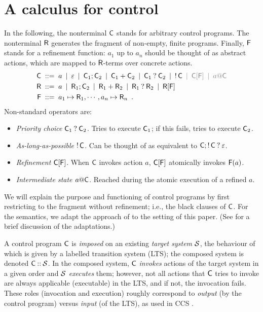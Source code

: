 \section{A calculus for control}
\label{sec:calculus}

In the following, the nonterminal $\mathsf{C}$ stands for arbitrary control programs. The nonterminal $\mathsf{R}$ generates the fragment of non-empty, finite programs. Finally, $\mathsf{F}$ stands for a refinement function: $a_1$ up to $a_n$ should be thought of as abstract actions, which are mapped to $\mathsf{R}$-terms over concrete actions.
%
\begin{align*}
\rC & \ruleis a \rulemid \term \rulemid \rC_1;\rC_2 \rulemid \rC_1+\rC_2 \rulemid \rC_1\orelse \rC_2 \rulemid \alap \rC \color{gray} \rulemid \rC[\rF] \rulemid a@\rC \color{black} \\
\rR & \ruleis a \rulemid \rR_1;\rC_2 \rulemid \rR_1+\rR_2 \rulemid \rR_1\orelse \rR_2 \rulemid \rR[\rF] \\
\rF & \ruleis a_1 \mapsto \rR_1, \cdots, a_n\mapsto \rR_n \enspace.
\end{align*}
%
Non-standard operators are:
\begin{itemize}
\item \emph{Priority choice} $\mathsf{C}_1\mathbin{?} \mathsf{C}_2$. Tries to execute $\mathsf{C}_1$; if this fails, tries to execute $\mathsf{C}_2$.
\item \emph{As-long-as-possible} $\mathop{!} \mathsf{C}$. Can be thought of as equivalent to $\mathsf{C};\mathop{!} \mathsf{C}\mathbin{?} \varepsilon$.
\item \emph{Refinement} $\mathsf{C}[\mathsf{F}]$. When $\mathsf{C}$ invokes action $a$, $\mathsf{C}[\mathsf{F}]$ atomically invokes $\mathsf{F}(a)$.
\item \emph{Intermediate state $a@\mathsf{C}$}. Reached during the atomic execution of a refined $a$.
\end{itemize}
%
We will explain the purpose and functioning of control programs by first restricting to the fragment without refinement; i.e., the black clauses of $\mathsf{C}$. For the semantics, we adapt the approach of \cite{CCS-Priority-Choice} to the setting of this paper. (See  for a brief discussion of the adaptations.)

A control program $\mathsf{C}$ is \emph{imposed} on an existing \emph{target system} $\mathcal{S}$, the behaviour of which is given by a labelled transition system (LTS); the composed system is denoted $\mathsf{C}\mathbin{{:}{:}}\mathcal{S}$. In the composed system, $\mathsf{C}$ \emph{invokes} actions of the target system in a given order and $\mathcal{S}$ \emph{executes} them; however, not all actions that $\mathsf{C}$ tries to invoke are always applicable (executable) in the LTS, and if not, the invocation fails. These roles (invocation and execution) roughly correspond to \emph{output} (by the control program) versus \emph{input} (of the LTS), as used in CCS \cite{CCS}.


